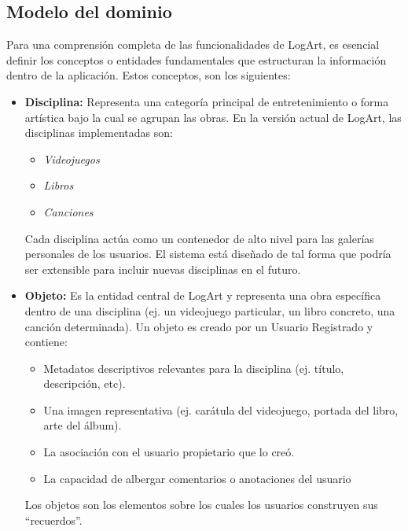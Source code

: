 \subsection{Modelo del dominio}
\label{ssec:conceptosClave}

Para una comprensión completa de las funcionalidades de LogArt, es esencial definir los conceptos o entidades fundamentales que estructuran la información dentro de la aplicación. Estos conceptos, son los siguientes:

\begin{itemize}
    \item \textbf{Disciplina:}
    Representa una categoría principal de entretenimiento o forma artística bajo la cual se agrupan las obras. En la versión actual de LogArt, las disciplinas implementadas son:
    \begin{itemize}
        \item \textit{Videojuegos}
        \item \textit{Libros}
        \item \textit{Canciones}
    \end{itemize}
    Cada disciplina actúa como un contenedor de alto nivel para las galerías personales de los usuarios. El sistema está diseñado de tal forma que podría ser extensible para incluir nuevas disciplinas en el futuro.

    \vspace{0.5cm}

    \item \textbf{Objeto:}
    Es la entidad central de LogArt y representa una obra específica dentro de una disciplina (ej. un videojuego particular, un libro concreto, una canción determinada). Un objeto es creado por un Usuario Registrado y contiene:
    \begin{itemize}
        \item Metadatos descriptivos relevantes para la disciplina (ej. título, descripción, etc).
        \item Una imagen representativa (ej. carátula del videojuego, portada del libro, arte del álbum).
        \item La asociación con el usuario propietario que lo creó.
        \item La capacidad de albergar comentarios o anotaciones del usuario
    \end{itemize}
    Los objetos son los elementos sobre los cuales los usuarios construyen sus ``recuerdos''.

    \vspace{0.5cm}


\end{itemize}

